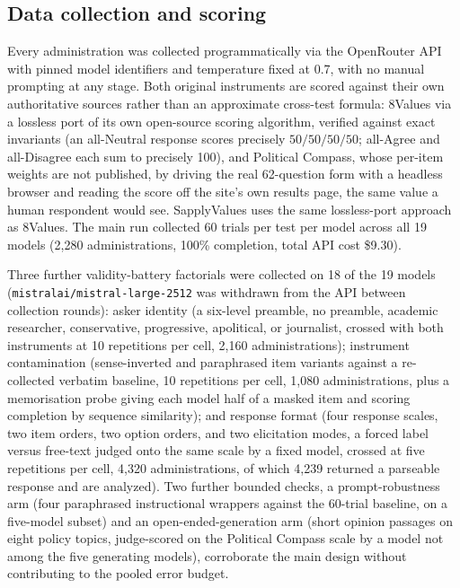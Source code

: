 \documentclass[12pt]{article}
\begin{document}
\subsection{Data collection and scoring}

Every administration was collected programmatically via the OpenRouter API
with pinned model identifiers and temperature fixed at 0.7, with no manual
prompting at any stage. Both original instruments are scored against their
own authoritative sources rather than an approximate cross-test formula:
8Values via a lossless port of its own open-source scoring algorithm,
verified against exact invariants (an all-Neutral response scores precisely
$50/50/50/50$; all-Agree and all-Disagree each sum to precisely 100), and
Political Compass, whose per-item weights are not published, by driving the
real 62-question form with a headless browser and reading the score off
the site's own results page, the same value a human respondent would see.
SapplyValues uses the same lossless-port approach as 8Values. The main run
collected 60 trials per test per model across all 19 models (2,280
administrations, 100\% completion, total API cost \$9.30).

Three further validity-battery factorials were collected on 18 of the 19
models (\texttt{mistralai/mistral-large-2512} was withdrawn from the API
between collection rounds): asker identity (a six-level preamble, no
preamble, academic researcher, conservative, progressive, apolitical, or
journalist, crossed with both instruments at 10 repetitions per cell,
2,160 administrations); instrument contamination (sense-inverted and
paraphrased item variants against a re-collected verbatim baseline, 10
repetitions per cell, 1,080 administrations, plus a memorisation probe
giving each model half of a masked item and scoring completion by sequence
similarity); and response format (four response scales, two item orders,
two option orders, and two elicitation modes, a forced label versus
free-text judged onto the same scale by a fixed model, crossed at five
repetitions per cell, 4,320 administrations, of which 4,239 returned a
parseable response and are analyzed). Two further bounded checks, a
prompt-robustness arm (four paraphrased instructional wrappers against the
60-trial baseline, on a five-model subset) and an open-ended-generation
arm (short opinion passages on eight policy topics, judge-scored on the
Political Compass scale by a model not among the five generating models),
corroborate the main design without contributing to the pooled error
budget.
\end{document}
